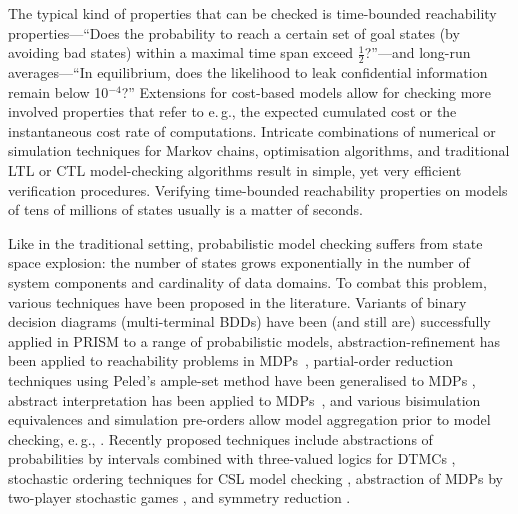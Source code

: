 \documentclass{llncs}
\begin{document}
The typical kind of properties that can be checked is time-bounded reachability properties---``Does
the probability to reach a certain set of goal states (by avoiding bad states) within a maximal
time span exceed $\frac{1}{2}$?''---and long-run averages---``In equilibrium, does the likelihood to
leak confidential information remain below 10$^{{-}4}$?''
Extensions for cost-based models allow for checking more involved properties that refer to e.\,g.,
the expected cumulated cost or the instantaneous cost rate of computations. 
Intricate combinations of numerical or simulation techniques for Markov chains, optimisation 
algorithms, and traditional LTL or CTL model-checking algorithms result in simple, yet very
efficient verification procedures.
Verifying time-bounded reachability properties on models of tens of millions of states usually
is a matter of seconds.

Like in the traditional setting, probabilistic model checking suffers from state space 
explosion: the number of states grows exponentially in the number of system
components and cardinality of data domains.
To combat this problem, various techniques have been proposed in the literature.
Variants of binary decision diagrams (multi-terminal BDDs) have been
(and still are)
successfully
applied in PRISM \cite{HintonKNP_TACAS06} to a range of probabilistic models,  abstraction-refinement has been 
applied to reachability problems in MDPs~\cite{DArgenioJJL_PAPMPROBMIV01}, partial-order reduction techniques using 
Peled's ample-set method have been generalised to MDPs \cite{GroesserB_FMCOB05}, abstract interpretation 
has been applied to MDPs~\cite{Monniaux_SCP05}, and various bisimulation equivalences and simulation 
pre-orders allow model aggregation prior to model checking, e.\,g., \cite{BaierKHW_IC05,Sproston_TSE06}.
Recently proposed techniques include abstractions of probabilities by intervals 
combined with three-valued logics for DTMCs \cite{FecherLW_SPIN06,Huth_VSS04,Huth_TCS05}, stochastic ordering
techniques for CSL model checking \cite{MamounPY_EQST06}, abstraction of MDPs by two-player stochastic 
games \cite{KwiatkowskaNP_QEST06}, and symmetry reduction \cite{KwiatkowskaNP_CAV06}.
\end{document}

